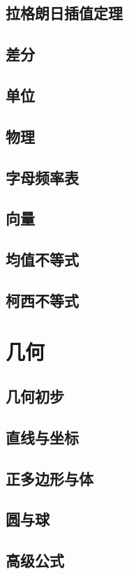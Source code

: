 \documentclass[UTF8]{ctexart}
\begin{document}
\subsection{拉格朗日插值定理}
\subsection{差分}
\subsection{单位}
\subsection{物理}
\subsection{字母频率表}
\subsection{向量}
\subsection{均值不等式}
\subsection{柯西不等式}

\newpage

\section{几何} 

\subsection{几何初步}
\subsection{直线与坐标}
\subsection{正多边形与体}
\subsection{圆与球}
\subsection{高级公式}
\end{document}
